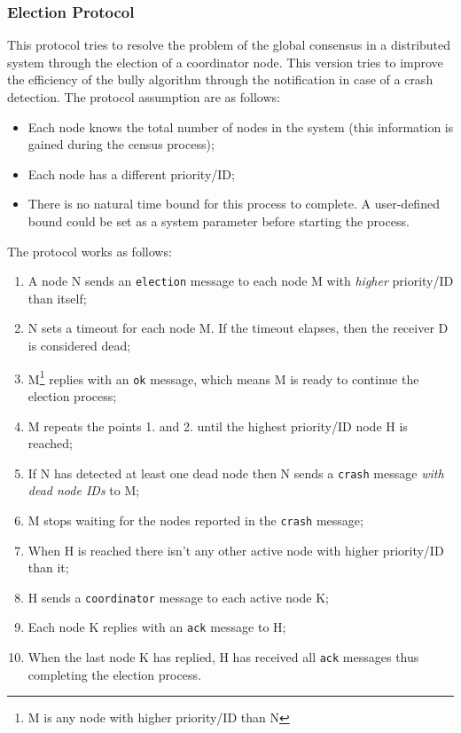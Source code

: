 \subsubsection{Election Protocol}
This protocol tries to resolve the problem of the global consensus in a distributed system through the election
of a coordinator node. This version tries to improve the efficiency of the bully algorithm through the notification in case of a crash detection. The protocol assumption are as follows:

\begin{itemize}
\item Each node knows the total number of nodes in the system (this
  information is gained during the census process);
\item Each node has a different priority/ID;
\item There is no natural time bound for this process to complete. A
  user-defined bound could be set as a system parameter before starting the
  process.
\end{itemize}

The protocol works as follows:

\begin{enumerate}
\item A node N sends an \texttt{election} message to each node M with
  \textit{higher} priority/ID than itself;
\item N sets a timeout for each node M. If the timeout elapses, then the
  receiver D is considered dead; %
\item M\footnote{M is any node with higher priority/ID than N} replies with an
  \texttt{ok} message, which means M is ready to continue the election process;
\item M repeats the points 1. and 2. until the highest priority/ID node H is
  reached;
\item If N has detected at least one dead node then N sends a \texttt{crash}
  message \textit{with dead node IDs} to M;
\item M stops waiting for the nodes reported in the \texttt{crash} message;
\item When H is reached there isn't any other active node with higher
  priority/ID than it;
\item H sends a \texttt{coordinator} message to each active node K;
\item Each node K replies with an \texttt{ack} message to H;
\item When the last node K has replied, H has received all \texttt{ack}
  messages thus completing the election process.
\end{enumerate}

